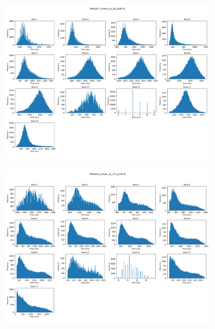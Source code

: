 \begin{figure}[h!]
    \centering
    \begin{subfigure}{0.49\textwidth}
        \centering
        \includegraphics[width=\linewidth]{img/data_ranges/sample_1.png}
        \label{fig:sub1}
    \end{subfigure}
    \hfill
    \begin{subfigure}{0.49\textwidth}
        \centering
        \includegraphics[width=\linewidth]{img/data_ranges/sample_2.png}
        \label{fig:sub2}
    \end{subfigure}


\end{figure}
